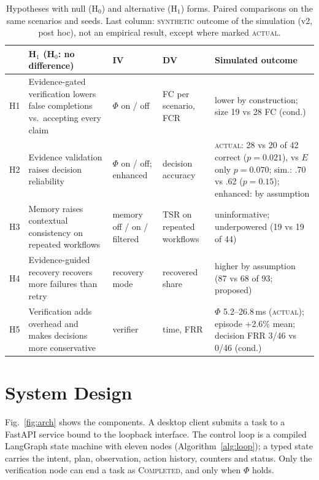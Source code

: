 \documentclass[conference]{IEEEtran}
\begin{document}
\begin{table}[t]
\centering
\caption{Hypotheses with null (H$_0$) and alternative (H$_1$) forms. Paired comparisons on the same scenarios and seeds. Last column: \textsc{synthetic} outcome of the simulation (v2, post hoc), not an empirical result, except where marked \textsc{actual}.}
\label{tab:hyp}
\scriptsize
\setlength{\tabcolsep}{1.6pt}
\begin{tabular}{@{}lp{2.85cm}p{1.75cm}p{1.45cm}p{1.9cm}@{}}
\toprule
 & H$_1$ (H$_0$: no difference) & IV & DV & Simulated outcome \\
\midrule
H1 & Evidence-gated verification lowers false completions vs.\ accepting every claim & $\Phi$ on / off & FC per scenario, FCR & lower by construction; size 19 vs 28 FC (cond.) \\
H2 & Evidence validation raises decision reliability & $\Phi$ on / off; enhanced & decision accuracy & \textsc{actual}: 28 vs 20 of 42 correct ($p{=}0.021$), vs $E$ only $p{=}0.070$; sim.: .70 vs .62 ($p{=}0.15$); enhanced: by assumption \\
H3 & Memory raises contextual consistency on repeated workflows & memory off / on / filtered & TSR on repeated workflows & uninformative; underpowered (19 vs 19 of 44) \\
H4 & Evidence-guided recovery recovers more failures than retry & recovery mode & recovered share & higher by assumption (87 vs 68 of 93; proposed) \\
H5 & Verification adds overhead and makes decisions more conservative & verifier & time, FRR & $\Phi$ 5.2--26.8\,ms (\textsc{actual}); episode +2.6\% mean; decision FRR 3/46 vs 0/46 (cond.) \\
\bottomrule
\end{tabular}
\end{table}

\section{System Design}



Fig.~\ref{fig:arch} shows the components. A desktop client submits a task to a FastAPI service bound to the loopback interface. The control loop is a compiled LangGraph state machine with eleven nodes (Algorithm~\ref{alg:loop}); a typed state carries the intent, plan, observation, action history, counters and status. Only the verification node can end a task as \textsc{Completed}, and only when $\Phi$ holds.
\end{document}
